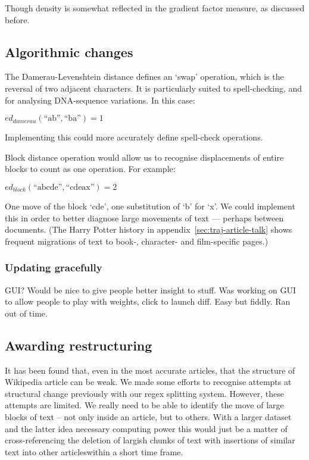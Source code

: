 Though density is somewhat reflected in the gradient factor measure,
as discussed before.

\subsection*{Algorithmic changes}
The Damerau-Levenshtein distance defines an `swap' operation, which is
the reversal of two adjacent characters. It is particularly suited to
spell-checking, and for analysing DNA-sequence variations. In this
case:

$ed_{damerau}(\text{``ab''},\text{``ba''}) = 1$

Implementing this could more accurately define spell-check operations.

Block distance operation would allow us to recognise displacements of
entire blocks to count as one operation. For
example:

$ed_{block}(\text{``abcde''},\text{``cdeax''})= 2$

One move of the block `cde', one substitution of `b' for
`x'.\cite{Tichy1984} We could implement this in order to better
diagnose large movements of text --- perhaps between documents. (The
Harry Potter history in appendix~\ref{sec:traj-article-talk} shows
frequent migrations of text to book-, character- and film-specific
pages.)

\subsubsection*{Updating gracefully}
GUI? Would be nice to give people better insight to stuff. Was working
on GUI to allow people to play with weights, click to launch
diff. Easy but fiddly. Ran out of time.

\subsection*{Awarding restructuring}
\label{restructuring}
It has been found that, even in the most accurate articles, that the
structure of Wikipedia article can be weak.\cite{Giles2005} We made
some efforts to recognise attempts at structural change previously with our regex splitting system. However, these attempts are limited. We really
need to be able to identify the move of large blocks of text -- not
only inside an article, but to others. With a larger dataset and the latter idea
necessary computing power this would just be a matter of
cross-referencing the deletion of largish chunks of text with
insertions of similar text into other articleswithin a short time frame.

